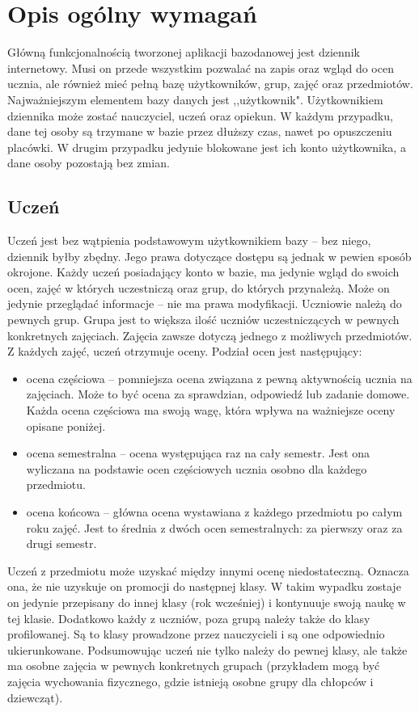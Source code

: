 \documentclass[12pt, titlepage]{article}
\begin{document}
\section{Opis ogólny wymagań}

Główną funkcjonalnością tworzonej aplikacji bazodanowej jest dziennik internetowy. Musi on przede wszystkim pozwalać na zapis oraz wgląd do ocen ucznia, ale również mieć pełną bazę użytkowników, grup, zajęć oraz przedmiotów.
Najważniejszym elementem bazy danych jest ,,użytkownik". Użytkownikiem dziennika może zostać nauczyciel, uczeń oraz opiekun. W każdym przypadku, dane tej osoby są trzymane w bazie przez dłuższy czas, nawet po opuszczeniu placówki. W drugim przypadku jedynie blokowane jest ich konto użytkownika, a dane osoby pozostają bez zmian.

\subsection{Uczeń}

Uczeń jest bez wątpienia podstawowym użytkownikiem bazy – bez niego, dziennik byłby zbędny. Jego prawa dotyczące dostępu są jednak w pewien sposób okrojone. Każdy uczeń posiadający konto w bazie, ma jedynie wgląd do swoich ocen, zajęć w których uczestniczą oraz grup, do których przynależą. Może on jedynie przeglądać informacje – nie ma prawa modyfikacji.
Uczniowie należą do pewnych grup. Grupa jest to większa ilość uczniów uczestniczących w pewnych konkretnych zajęciach. Zajęcia zawsze dotyczą jednego z możliwych przedmiotów. Z każdych zajęć, uczeń otrzymuje oceny. Podział ocen jest następujący:
\begin{itemize}
\item ocena częściowa -- pomniejsza ocena związana z pewną aktywnością ucznia na zajęciach. Może to być ocena za sprawdzian, odpowiedź lub zadanie domowe. Każda ocena częściowa ma swoją wagę, która wpływa na ważniejsze oceny opisane poniżej.
\item ocena semestralna -- ocena występująca raz na cały semestr. Jest ona wyliczana na podstawie ocen częściowych ucznia osobno dla każdego przedmiotu.
\item ocena końcowa -- główna ocena wystawiana z każdego przedmiotu po całym roku zajęć. Jest to średnia z dwóch ocen semestralnych: za pierwszy oraz za drugi semestr.
\end{itemize}
Uczeń z przedmiotu może uzyskać między innymi ocenę niedostateczną. Oznacza ona, że nie uzyskuje on promocji do następnej klasy. W takim wypadku zostaje on jedynie przepisany do innej klasy (rok wcześniej) i kontynuuje swoją naukę w tej klasie.
Dodatkowo każdy z uczniów, poza grupą należy także do klasy profilowanej. Są to klasy prowadzone przez nauczycieli i są one odpowiednio ukierunkowane. Podsumowując uczeń nie tylko należy do pewnej klasy, ale także ma osobne zajęcia w pewnych konkretnych grupach (przykładem mogą być zajęcia wychowania fizycznego, gdzie istnieją osobne grupy dla chłopców i dziewcząt).
\end{document}
